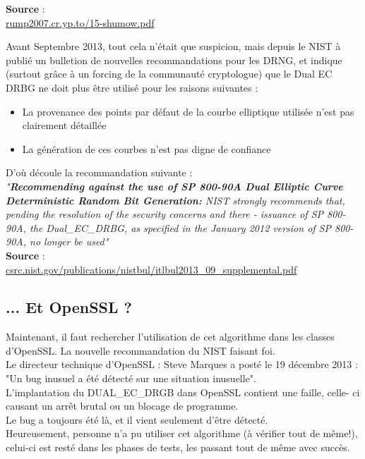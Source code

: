 \documentclass{article}
\begin{document}
	\textbf{Source} : \\
	\href{http://rump2007.cr.yp.to/15-shumow.pdf}
	{rump2007.cr.yp.to/15-shumow.pdf}
	
	Avant Septembre 2013, tout cela n'était que suspicion, mais depuis le 
	NIST à publié un bulletion de nouvelles recommandations pour les DRNG, et 
	indique (surtout grâce à un forcing de la communauté cryptologue) que le Dual EC 
	DRBG ne doit plus être utilisé pour les raisons suivantes :
	\begin{itemize}
		\item La provenance des points par défaut de la courbe elliptique 
		utilisée n'est pas clairement détaillée
		\item La génération de ces courbes n'est pas digne de confiance\\
	\end{itemize}

	D'où découle la recommandation suivante : \\
	\textit{"\textbf{Recommending against the use of SP 800-90A Dual Elliptic 
	Curve Deterministic Random Bit Generation:} NIST strongly recommends that, 
	pending the resolution of the security concerns and there - issuance of SP 
	800-90A, the Dual\_EC\_DRBG, as specified in the January 2012 version of 
	SP 800-90A, no longer be used"}\\

	\textbf{Source} : \\
	\href{http://csrc.nist.gov/publications/nistbul/itlbul2013\_09\_supplemental.pdf}
	{csrc.nist.gov/publications/nistbul/itlbul2013\_09\_supplemental.pdf}\\	
	
	\subsection{... Et OpenSSL ?}
	
	
	Maintenant, il faut rechercher l'utilisation de cet algorithme dans les 
	classes d'OpenSSL. La nouvelle recommandation du NIST faisant foi.\\

	Le directeur technique d'OpenSSL : Steve Marques a posté le 19 décembre 
	2013 : "Un bug inusuel a été détecté sur une situation inusuelle". \\
	
	L'implantation du DUAL\_EC\_DRGB dans OpenSSL contient une faille, celle-
	ci causant un arrêt brutal ou un blocage de programme.\\
	Le bug a toujours été là, et il vient seulement d'être détecté.\\
	Heureusement, personne n'a pu utiliser cet algorithme (à vérifier tout de 
	même!), celui-ci est resté dans les phases de tests, les passant tout de 
	même avec succès.\\
\end{document}
